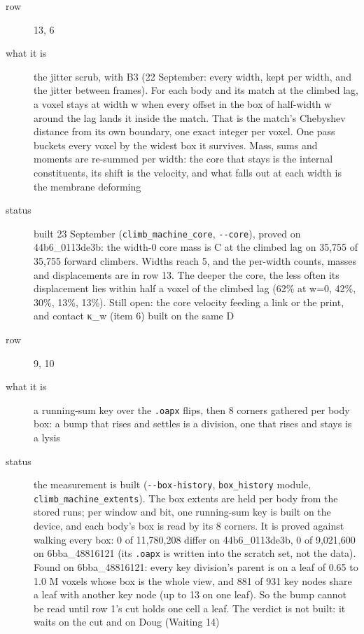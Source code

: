 \begin{description}
\item[{row}] 13, 6
\item[{what it is}] the jitter scrub, with B3 (22 September: every width, kept per width, and the jitter between frames). For each body and its match at the climbed lag, a voxel stays at width w when every offset in the box of half-width w around the lag lands it inside the match. That is the match's Chebyshev distance from its own boundary, one exact integer per voxel. One pass buckets every voxel by the widest box it survives. Mass, sums and moments are re-summed per width: the core that stays is the internal constituents, its shift is the velocity, and what falls out at each width is the membrane deforming
\item[{status}] built 23 September (\texttt{climb\_\allowbreak{}machine\_\allowbreak{}core}, \texttt{-\allowbreak{}-\allowbreak{}core}), proved on 44b6\_\allowbreak{}0113de3b: the width-0 core mass is C at the climbed lag on 35,755 of 35,755 forward climbers. Widths reach 5, and the per-width counts, masses and displacements are in row 13. The deeper the core, the less often its displacement lies within half a voxel of the climbed lag (62\% at w=0, 42\%, 30\%, 13\%, 13\%). Still open: the core velocity feeding a link or the print, and contact κ\_\allowbreak{}w (item 6) built on the same D
\end{description}

\begin{description}
\item[{row}] 9, 10
\item[{what it is}] a running-sum key over the \texttt{.\allowbreak{}oapx} flips, then 8 corners gathered per body box: a bump that rises and settles is a division, one that rises and stays is a lysis
\item[{status}] the measurement is built (\texttt{-\allowbreak{}-\allowbreak{}box-\allowbreak{}history}, \texttt{box\_\allowbreak{}history} module, \texttt{climb\_\allowbreak{}machine\_\allowbreak{}extents}). The box extents are held per body from the stored runs; per window and bit, one running-sum key is built on the device, and each body's box is read by its 8 corners. It is proved against walking every box: 0 of 11,780,208 differ on 44b6\_\allowbreak{}0113de3b, 0 of 9,021,600 on 6bba\_\allowbreak{}48816121 (its \texttt{.\allowbreak{}oapx} is written into the scratch set, not the data). Found on 6bba\_\allowbreak{}48816121: every key division's parent is on a leaf of 0.65 to 1.0 M voxels whose box is the whole view, and 881 of 931 key nodes share a leaf with another key node (up to 13 on one leaf). So the bump cannot be read until row 1's cut holds one cell a leaf. The verdict is not built: it waits on the cut and on Doug (Waiting 14)
\end{description}

